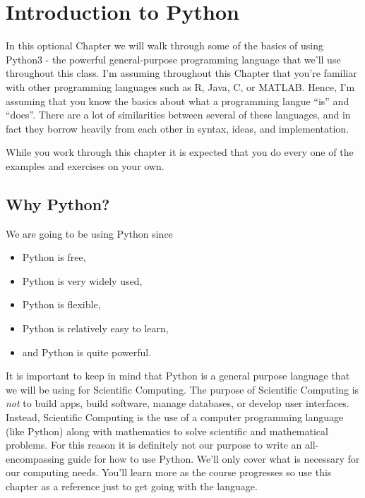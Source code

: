 \documentclass[
]{book}
\providecommand{\tightlist}{%
  \setlength{\itemsep}{0pt}\setlength{\parskip}{0pt}}
\theoremstyle{definition}
\theoremstyle{definition}
\theoremstyle{definition}
\theoremstyle{remark}
\begin{document}
\hypertarget{appendix-appendices}{%
\appendix}


\hypertarget{ch:python}{%
\chapter{Introduction to Python}\label{ch:python}}

In this optional Chapter we will walk through some of the basics of
using Python3 - the powerful general-purpose programming language that
we'll use throughout this class. I'm assuming throughout this Chapter
that you're familiar with other programming languages such as R, Java,
C, or MATLAB. Hence, I'm assuming that you know the basics about what a
programming langue ``is'' and ``does''. There are a lot of similarities
between several of these languages, and in fact they borrow heavily from
each other in syntax, ideas, and implementation.

While you work through this chapter it is expected that you do every one of the examples and exercises on your own.

\hypertarget{why-python}{%
\section{Why Python?}\label{why-python}}

We are going to be using Python since

\begin{itemize}
\tightlist
\item
  Python is free,
\item
  Python is very widely used,
\item
  Python is flexible,
\item
  Python is relatively easy to learn,
\item
  and Python is quite powerful.
\end{itemize}

It is important to keep in mind that Python is a general purpose language that we will be using for Scientific Computing. The purpose of Scientific Computing is \emph{not} to build apps, build software, manage databases, or develop user interfaces. Instead, Scientific Computing is the use of a computer programming language (like Python) along with mathematics to solve scientific and mathematical problems. For this reason it is definitely not our purpose to write an all-encompassing guide for how to use Python. We'll only cover what is necessary for our computing needs. You'll learn more as the course progresses so use this chapter as a reference just to get going with the language.
\end{document}
